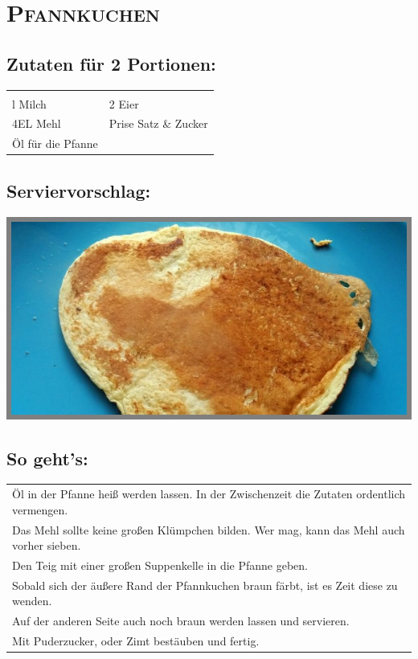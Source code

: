 \section{\textsc{Pfannkuchen}}

\subsection*{Zutaten für 2 Portionen:}

\begin{tabular}{p{7.5cm} p{7.5cm}}
	& \\
	\sfrac{1}{4}l Milch & 2 Eier \\
	4EL Mehl & Prise Satz \& Zucker \\
  Öl für die Pfanne
\end{tabular}

\subsection*{Serviervorschlag:}

\includegraphics[width=\textwidth]{img/pfannkuchen.jpg} \cite{pfannkuchen}

\subsection*{So geht's:}

\begin{tabular}{p{15cm}}
	\\
  Öl in der Pfanne heiß werden lassen. In der Zwischenzeit die Zutaten ordentlich vermengen.\\
  Das Mehl sollte keine großen Klümpchen bilden. Wer mag, kann das Mehl auch vorher sieben.\\
  Den Teig mit einer großen Suppenkelle in die Pfanne geben.\\
  Sobald sich der äußere Rand der Pfannkuchen braun färbt, ist es Zeit diese zu wenden. \\
  Auf der anderen Seite auch noch braun werden lassen und servieren.\\
  Mit Puderzucker, oder Zimt bestäuben und fertig.
\end{tabular}
